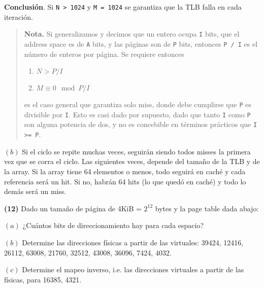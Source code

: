 \documentclass[12pt]{article}
\theoremstyle{definition}
\begin{document}
\textbf{Conclusión}. Si \texttt{N > 1024} y \texttt{M = 1024} se garantiza que la
TLB falla en cada iteración.


\small
\begin{quote}

\textbf{Nota.} Si generalizamos y decimos que un entero ocupa \texttt{I} bits,
que el address space es de \texttt{A} bits, y las páginas son de \texttt{P}
bits, entonces \texttt{P / I} es el número de enteros por página. Se requiere
entonces

\begin{enumerate}
    \item $N > P / I$
    \item $M \equiv 0 \mod P / I$
\end{enumerate}

es el caso general que garantiza solo miss, donde debe cumplirse que \texttt{P}
es divisible por \texttt{I}. Esto es casi dado por supuesto, dado que 
tanto \texttt{I} como \texttt{P} son alguna potencia de dos, y no es concebible
en términos prácticos que \texttt{I >= P}.

\end{quote}
\normalsize

$(b)$ Si el ciclo se repite muchas veces, seguirán siendo todos misses la
primera vez que se corra el ciclo. Las siguientes veces, depende del tamaño de
la TLB y de la array. Si la array tiene 64 elementos o menos, todo seguirá en
caché y cada referencia será un hit. Si no, habrán 64 hits (lo que quedó en
caché) y todo lo demás será un miss.



\pagebreak 

\begin{shaded}
    \textbf{(12)} Dado un tamaño de página de 4KiB = $2^{12}$ bytes y la page
    table dada abajo:

    $(a)$ ¿Cuántos bits de direccionamiento hay para cada espacio? 

    $(b)$ Determine las direcciones físicas a partir de las virtuales: 39424,
    12416, 26112, 63008, 21760, 32512, 43008, 36096, 7424, 4032.

    $(c)$ Determine el mapeo inverso, i.e. las direcciones virtuales a partir de
    las físicas, para 16385, 4321.
\end{shaded}
\end{document}
